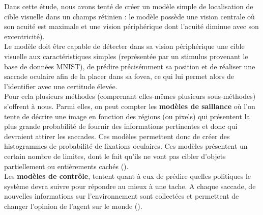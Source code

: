 Dans cette étude, nous avons tenté de créer un modèle simple de localisation de cible visuelle dans un champs rétinien : le modèle possède une vision centrale où son acuité est maximale et une vision périphérique dont l'acuité diminue avec son excentricité).\\
Le modèle doit être capable de détecter dans sa vision périphérique une cible visuelle aux caractéristiques simples (représentée par un stimulus provenant le base de données MNIST), de prédire précisémment sa position et de réaliser une saccade oculaire afin de la placer dans sa fovea, ce qui lui permet alors de l'identifier avec une certitude élevée.\\
Pour cela plusieurs méthodes (comprenant elles-mêmes plusieurs sous-méthodes) s'offrent à nous. Parmi elles, on peut compter les \textbf{modèles de saillance} où l'on tente de décrire une image en fonction des régions (ou pixels) qui présentent la plus grande probabilité de fournir des informations pertinentes et donc qui devraient attirer les saccades. Ces modèles permettent donc de créer des histogrammes de probabilité de fixations oculaires. Ces modèles présentent un certain nombre de limites, dont le fait qu'ils ne vont pas cibler d'objets partiellement ou entièrements cachés (\cite{Butko2010}).\\
Les \textbf{modèles de contrôle}, tentent quant à eux de prédire quelles politiques le système devra suivre pour répondre au mieux à une tache. A chaque saccade, de nouvelles informations sur l'environnement sont collectées et permettent de changer l'opinion de l'agent sur le monde (\cite{Butko2010}).
